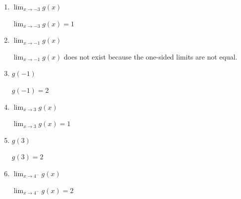 \documentclass{article}
\begin{document}
\begin{enumerate}[resume]
\begin{enumerate}
    \item
      \begin{problem}
        $\displaystyle \lim_{x \rightarrow -3} g(x)$
      \end{problem}

      \begin{solution}
        $\displaystyle \lim_{x \rightarrow -3} g(x)=1$
      \end{solution}

    \item
      \begin{problem}
        $\displaystyle \lim_{x \rightarrow -1} g(x)$
      \end{problem}

      \begin{solution}
        $\displaystyle \lim_{x \rightarrow -1} g(x)$ does not exist because the one-sided limits
        are not equal.
      \end{solution}

    \item
      \begin{problem}
        $g(-1)$
      \end{problem}

      \begin{solution}
       $g(-1)=2$
      \end{solution}

    \item
      \begin{problem}
        $\displaystyle \lim_{x \rightarrow 3} g(x)$
      \end{problem}

      \begin{solution}
        $\displaystyle \lim_{x \rightarrow 3} g(x) = 1$
      \end{solution}

    \item
      \begin{problem}
        $g(3)$
      \end{problem}

      \begin{solution}
        $g(3) = 2$
      \end{solution}

    \item
      \begin{problem}
        $\displaystyle \lim_{x \rightarrow 4^-} g(x)$
      \end{problem}

      \begin{solution}
        $\displaystyle \lim_{x \rightarrow 4^-} g(x)=2$
      \end{solution}

    \end{enumerate}
  \probonly{\end{multicols}}

  \pspace{0.25in}

\end{enumerate}
\end{document}
